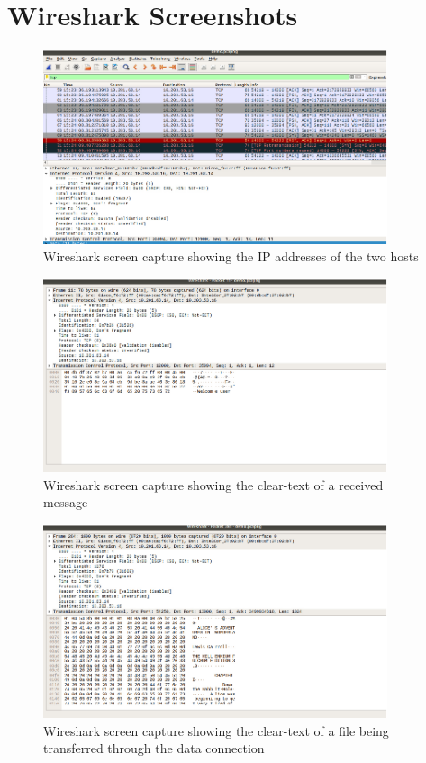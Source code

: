 \documentclass[journal, a4paper]{IEEEtran}
\begin{document}
\section{Wireshark Screenshots}
\label{appndx}
\begin{figure}[hbtp!]
	\centering
	\includegraphics[width = 0.9\textwidth]{wireshark2}
	\caption{Wireshark screen capture showing the IP addresses of the two hosts}
	\label{w1}
\end{figure}
\begin{figure}[hbtp!]
	\centering
	\includegraphics[width = 0.9\textwidth]{wireshark1}
	\caption{Wireshark screen capture showing the clear-text of a received message}
\end{figure}
\begin{figure}[hbtp!]
	\centering
	\includegraphics[width = 0.9\textwidth]{wireshark4}
	\caption{Wireshark screen capture showing the clear-text of a file being transferred through the data connection}
	\label{w4}
\end{figure}
\end{document}
